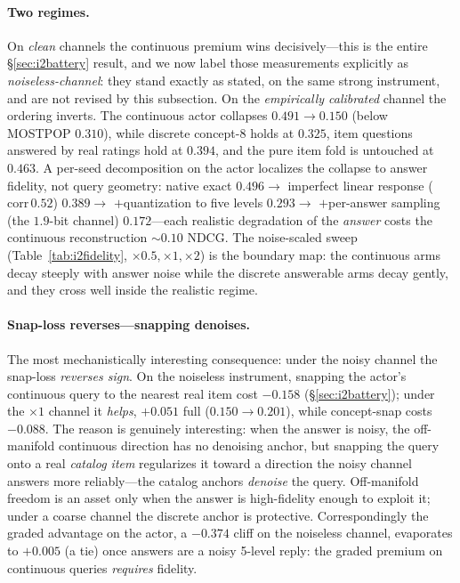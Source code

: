 \documentclass[11pt]{article}
\begin{document}
\paragraph{Two regimes.} On \emph{clean} channels the continuous premium wins decisively---this is the entire
\S\ref{sec:i2battery} result, and we now label those measurements explicitly as \emph{noiseless-channel}: they stand
exactly as stated, on the same strong instrument, and are not revised by this subsection. On the \emph{empirically
calibrated} channel the ordering inverts. The continuous actor collapses $0.491\!\to\!0.150$ (below MOSTPOP $0.310$),
while discrete concept-8 holds at $0.325$, item questions answered by real ratings hold at $0.394$, and the pure item
fold is untouched at $0.463$. A per-seed decomposition on the actor localizes the collapse to answer fidelity, not query
geometry: native exact $0.496 \to$ imperfect linear response ($\mathrm{corr}\,0.52$) $0.389 \to$ $+$quantization to five
levels $0.293 \to$ $+$per-answer sampling (the $1.9$-bit channel) $0.172$---each realistic degradation of the
\emph{answer} costs the continuous reconstruction ${\sim}0.10$ NDCG. The noise-scaled sweep (Table~\ref{tab:i2fidelity},
$\times0.5,\times1,\times2$) is the boundary map: the continuous arms decay steeply with answer noise while the discrete
answerable arms decay gently, and they cross well inside the realistic regime.

\paragraph{Snap-loss reverses---snapping denoises.} The most mechanistically interesting consequence: under the noisy
channel the snap-loss \emph{reverses sign}. On the noiseless instrument, snapping the actor's continuous query to the
nearest real item cost $-0.158$ (\S\ref{sec:i2battery}); under the $\times1$ channel it \emph{helps}, $+0.051$ full
($0.150\to0.201$), while concept-snap costs $-0.088$. The reason is genuinely interesting: when the answer is noisy, the
off-manifold continuous direction has no denoising anchor, but snapping the query onto a real \emph{catalog item}
regularizes it toward a direction the noisy channel answers more reliably---the catalog anchors \emph{denoise} the query.
Off-manifold freedom is an asset only when the answer is high-fidelity enough to exploit it; under a coarse channel the
discrete anchor is protective. Correspondingly the graded advantage on the actor, a $-0.374$ cliff on the noiseless
channel, evaporates to $+0.005$ (a tie) once answers are a noisy 5-level reply: the graded premium on continuous queries
\emph{requires} fidelity.
\end{document}
